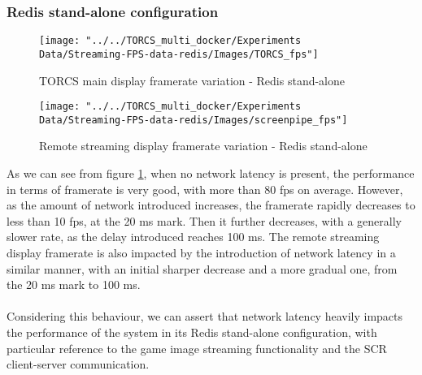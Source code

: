 \subsubsection{Redis stand-alone configuration}
\begin{figure}[h!]
	\centering
	\texttt{[image: "../../TORCS\_multi\_docker/Experiments Data/Streaming-FPS-data-redis/Images/TORCS\_fps"]}
	\caption[TORCS main display framerate variation - Redis stand-alone]{TORCS main display framerate variation - Redis stand-alone}
	\label{fig:torcs-merged-fps-redis}
\end{figure}
\begin{figure}[h!]
	\centering
	\texttt{[image: "../../TORCS\_multi\_docker/Experiments Data/Streaming-FPS-data-redis/Images/screenpipe\_fps"]}
	\caption[Remote streaming display framerate variation - Redis stand-alone]{Remote streaming display framerate variation - Redis stand-alone}
	\label{fig:screenpipe-merged-fps-redis}
\end{figure}
As we can see from figure \ref{fig:torcs-merged-fps-redis}, when no network latency is present, the performance in terms of framerate is very good, with more than 80 fps on average. However, as the amount of network introduced increases, the framerate rapidly decreases to less than 10 fps, at the 20 ms mark. Then it further decreases, with a generally slower rate, as the delay introduced reaches 100 ms. The remote streaming display framerate is also impacted by the introduction of network latency in a similar manner, with an initial sharper decrease and a more gradual one, from the 20 ms mark to 100 ms. \\ \\
Considering this behaviour, we can assert that network latency heavily impacts the performance of the system in its Redis stand-alone configuration, with particular reference to the game image streaming functionality and the SCR client-server communication.

